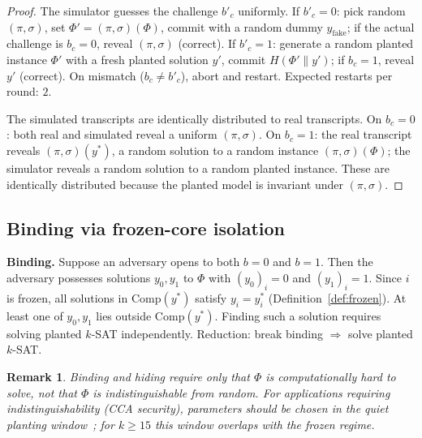 \documentclass[11pt]{article}
\newtheorem{remark}[theorem]{Remark}
\begin{document}
\begin{proof}
The simulator guesses the challenge $b'_c$ uniformly.  If $b'_c = 0$: pick random $(\pi,\sigma)$, set $\Phi' = (\pi,\sigma)(\Phi)$, commit with a random dummy $y_{\mathrm{fake}}$; if the actual challenge is $b_c = 0$, reveal $(\pi,\sigma)$ (correct).  If $b'_c = 1$: generate a random planted instance $\Phi'$ with a fresh planted solution $y'$, commit $H(\Phi' \| y')$; if $b_c = 1$, reveal $y'$ (correct).  On mismatch ($b_c \neq b'_c$), abort and restart.  Expected restarts per round: $2$.

The simulated transcripts are identically distributed to real transcripts.  On $b_c = 0$: both real and simulated reveal a uniform $(\pi,\sigma)$.  On $b_c = 1$: the real transcript reveals $(\pi,\sigma)(y^*)$, a random solution to a random instance $(\pi,\sigma)(\Phi)$; the simulator reveals a random solution to a random planted instance.  These are identically distributed because the planted model is invariant under $(\pi,\sigma)$.
\end{proof}


\subsection{Binding via frozen-core isolation}\label{sec:binding-empirical}

\noindent\textbf{Binding.}  Suppose an adversary opens to both $b = 0$ and $b = 1$.  Then the adversary possesses solutions $y_0, y_1$ to $\Phi$ with $(y_0)_i = 0$ and $(y_1)_i = 1$.  Since $i$ is frozen, all solutions in $\mathrm{Comp}(y^*)$ satisfy $y_i = y^*_i$ (Definition~\ref{def:frozen}).  At least one of $y_0, y_1$ lies outside $\mathrm{Comp}(y^*)$.  Finding such a solution requires solving planted $k$-SAT independently.  Reduction: break binding $\Rightarrow$ solve planted $k$-SAT.

\begin{remark}
Binding and hiding require only that $\Phi$ is computationally hard to solve, not that $\Phi$ is indistinguishable from random.  For applications requiring indistinguishability (CCA security), parameters should be chosen in the quiet planting window~\cite{ACO08}; for $k \geq 15$ this window overlaps with the frozen regime.
\end{remark}
\end{document}
